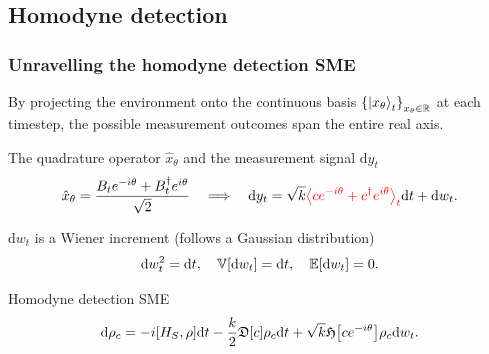 \documentclass[10pt,xcolor=table]{beamer}
\theoremstyle{definition}
\begin{document}
\subsection{Homodyne detection}
\begin{frame}
	\frametitle{Unravelling the homodyne detection SME}
	By projecting the environment onto the continuous basis $\qty{\ket{x_\theta}_t}_{x_\theta\in\mathbb{R}}$ at each timestep, the possible measurement outcomes span the entire real axis.
	\begin{block}{The quadrature operator $\hat{x}_\theta$ and the measurement signal $\mathrm{d}y_t$}
		\begin{equation*}
			\hat{x}_\theta = \frac{B_t e^{-i\theta}+B_t^\dagger e^{i\theta}}{\sqrt{2}}\quad\Longrightarrow\quad\mathrm{d}y_t = \sqrt{k}\textcolor{red}{\expval{ce^{-i\theta}+c^\dagger e^{i\theta}}_t}\mathrm{d}t+\mathrm{d}w_t.
		\end{equation*}
	\end{block}
	\begin{block}{$\mathrm{d}w_t$ is a Wiener increment (follows a Gaussian distribution)}
		\begin{equation*}
			\mathrm{d}w_t^2=\mathrm{d}t,\quad \mathbb{V}\qty[\mathrm{d}w_t]=\mathrm{d}t,\quad \mathbb{E}\qty[\mathrm{d}w_t]=0.
		\end{equation*}
	\end{block}
	\begin{alertblock}{Homodyne detection SME}
		\begin{equation*}
			\mathrm{d}\rho_c = -i\qty[H_S, \rho]\mathrm{d}t-\frac{k}{2}\mathfrak{D}\qty[c]\rho_c\mathrm{d}t + \sqrt{k}\mathfrak{H}\qty[ce^{-i\theta}]\rho_c \mathrm{d}w_t.
		\end{equation*}
	\end{alertblock}
\end{frame}
\end{document}
